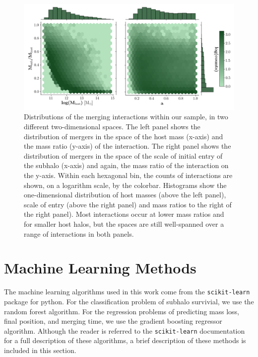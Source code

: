 \documentclass[fleqn,usenatbib]{mnras}
\begin{document}
\begin{figure}[h]
	\includegraphics[width=\textwidth]{Figures/combined_distributions_logbin}
    \caption{Distributions of the merging interactions within our sample, in two different two-dimensional spaces. The left panel shows the distribution of mergers in the space of the host mass (x-axis) and the mass ratio (y-axis) of the interaction. The right panel shows the distribution of mergers in the space of the scale of initial entry of the subhalo (x-axis) and again, the mass ratio of the interaction on the y-axis. Within each hexagonal bin, the counts of interactions are shown, on a logarithm scale, by the colorbar. Histograms show the one-dimensional distribution of host masses (above the left panel), scale of entry (above the right panel) and mass ratios to the right of the right panel). Most interactions occur at lower mass ratios and for smaller host halos, but the spaces are still well-spanned over a range of interactions in both panels. }
    \label{fig:combined_distributions_logBin}
\end{figure}



\section{Machine Learning Methods}
\label{sec:ML Methods}
The machine learning algorithms used in this work come from the \texttt{scikit-learn} package for python. For the classification problem of subhalo survivial, we use the random forest algorithm. For the regression problems of predicting mass loss, final position, and merging time, we use the gradient boosting regressor algorithm. Although the reader is referred to the \texttt{scikit-learn} documentation for a full description of these algorithms, a brief description of these methods is included in this section.
\end{document}
